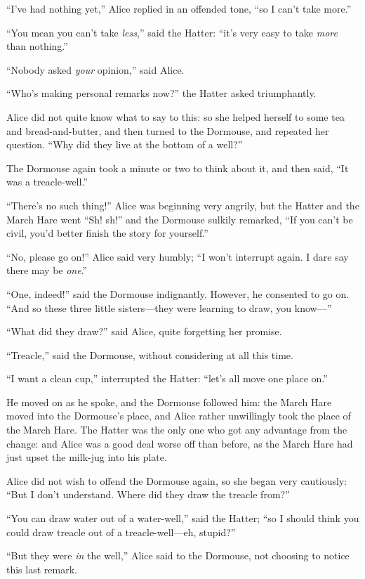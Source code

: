 \documentclass[book, 20pt]{extbook}
\begin{document}
``I've had nothing yet,'' Alice replied in an offended tone, ``so I
can't take more.''

``You mean you can't take \emph{less},'' said the Hatter: ``it's very
easy to take \emph{more} than nothing.''

``Nobody asked \emph{your} opinion,'' said Alice.

``Who's making personal remarks now?'' the Hatter asked triumphantly.

Alice did not quite know what to say to this: so she helped herself to
some tea and bread-and-butter, and then turned to the Dormouse, and
repeated her question. ``Why did they live at the bottom of a well?''

The Dormouse again took a minute or two to think about it, and then
said, ``It was a treacle-well.''

``There's no such thing!'' Alice was beginning very angrily, but the
Hatter and the March Hare went ``Sh! sh!'' and the Dormouse sulkily
remarked, ``If you can't be civil, you'd better finish the story for
yourself.''

``No, please go on!'' Alice said very humbly; ``I won't interrupt again.
I dare say there may be \emph{one}.''

``One, indeed!'' said the Dormouse indignantly. However, he consented to
go on. ``And so these three little sisters---they were learning to draw,
you know---''

``What did they draw?'' said Alice, quite forgetting her promise.

``Treacle,'' said the Dormouse, without considering at all this time.

``I want a clean cup,'' interrupted the Hatter: ``let's all move one
place on.''

He moved on as he spoke, and the Dormouse followed him: the March Hare
moved into the Dormouse's place, and Alice rather unwillingly took the
place of the March Hare. The Hatter was the only one who got any
advantage from the change: and Alice was a good deal worse off than
before, as the March Hare had just upset the milk-jug into his plate.

Alice did not wish to offend the Dormouse again, so she began very
cautiously: ``But I don't understand. Where did they draw the treacle
from?''

``You can draw water out of a water-well,'' said the Hatter; ``so I
should think you could draw treacle out of a treacle-well---eh,
stupid?''

``But they were \emph{in} the well,'' Alice said to the Dormouse, not
choosing to notice this last remark.
\end{document}
